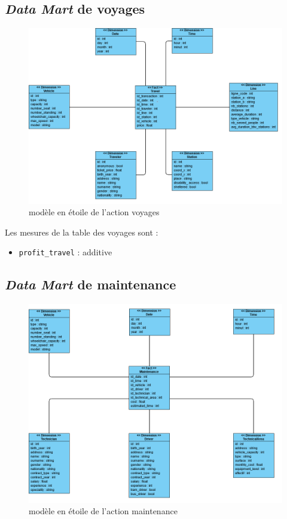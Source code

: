 \documentclass[a4paper,12pt]{report}
\begin{document}
\subsection*{\textit{Data Mart} de \og voyages \fg}
\label{subsec:data_mart_voyages}
\begin{figure}[!ht]
  \centering
  \includegraphics[scale=0.65]{images/voyages_datamart.png}
  \caption{modèle en étoile de l'action \og voyages \fg}
\end{figure}

Les mesures de la table des voyages sont :
\begin{itemize}
  \item \texttt{profit\_travel} : additive
\end{itemize}

\newpage

\subsection*{\textit{Data Mart} de \og maintenance \fg}
\label{subsec:data_mart_maintenance}
\begin{figure}[!ht]
  \centering
  \includegraphics[scale=0.65]{images/maintenance_datamart.png}
  \caption{modèle en étoile de l'action \og maintenance \fg}
\end{figure}
\end{document}
